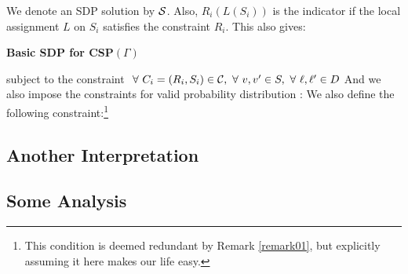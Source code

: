 \iffalse
We denote an SDP solution by $\mathcal{S}$. Also, $R_i(L(S_i))$ is the indicator if the local assignment $L$ on $S_i$ satisfies the
constraint $R_i$. This also gives: 
\begin{definition}{\label{def1}}
{\bf Basic SDP for CSP$(\Gamma)$}  

subject to the constraint $\ \forall \  C_i = (R_i, S_i) \in \mathcal{C},\ \forall \  v, v' \in S, \ \forall \  \ell, \ell' \in D $
And we also impose the constraints for valid probability distribution : 
We also define the following constraint:\footnote{This condition is deemed redundant by Remark \ref{remark01}, but explicitly assuming it here makes our life easy.} 
\end{definition}

\subsection{Another Interpretation}



\subsection{Some Analysis}


